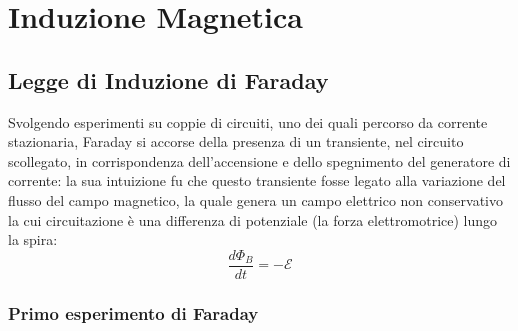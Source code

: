\section{Induzione Magnetica}

\subsection{Legge di Induzione di Faraday}

Svolgendo esperimenti su coppie di circuiti, uno dei quali percorso da corrente stazionaria, Faraday si accorse della presenza di un transiente, nel circuito scollegato, in corrispondenza dell'accensione e dello spegnimento del generatore di corrente: la sua intuizione fu che questo transiente fosse legato alla variazione del flusso del campo magnetico, la quale genera un campo elettrico non conservativo la cui circuitazione è una differenza di potenziale (la forza elettromotrice) lungo la spira:
\begin{equation}
	\frac{d\Phi_B}{dt} = -\mathcal{E}
	\label{eq:1}
\end{equation}

\subsubsection{Primo esperimento di Faraday}

